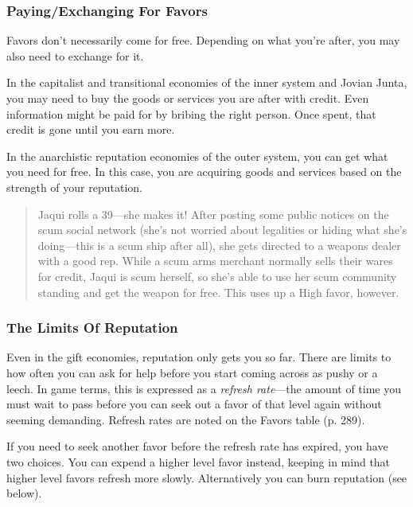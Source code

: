 \subsubsection{Paying/Exchanging For Favors} 

Favors don't necessarily come for free. Depending on what you're after, you may also need to exchange for it. 

In the capitalist and transitional economies of the inner system and Jovian Junta, you may need to buy the goods or services you are after with credit. Even information might be paid for by bribing the right person. Once spent, that credit is gone until you earn more. 

In the anarchistic reputation economies of the outer system, you can get what you need for free. In this case, you are acquiring goods and services based on the strength of your reputation. 

\begin{quotation} Jaqui rolls a 39—she makes it! After posting some public notices on the scum social network (she’s not worried about legalities or hiding what she’s doing—this is a scum ship after all), she gets directed to a weapons dealer with a good rep. While a scum arms merchant normally sells their wares for credit, Jaqui is scum herself, so she’s able to use her scum community standing and get the weapon for free. This uses up a High favor, however. \end{quotation} 



\subsubsection{The Limits Of Reputation} 

Even in the gift economies, reputation only gets you so far. There are limits to how often you can ask for help before you start coming across as pushy or a leech. In game terms, this is expressed as a \textit{refresh rate}—the amount of time you must wait to pass before you can seek out a favor of that level again without seeming demanding. Refresh rates are noted on the Favors table (p. 289). 

If you need to seek another favor before the refresh rate has expired, you have two choices. You can expend a higher level favor instead, keeping in mind that higher level favors refresh more slowly. Alternatively you can burn reputation (see below). 

